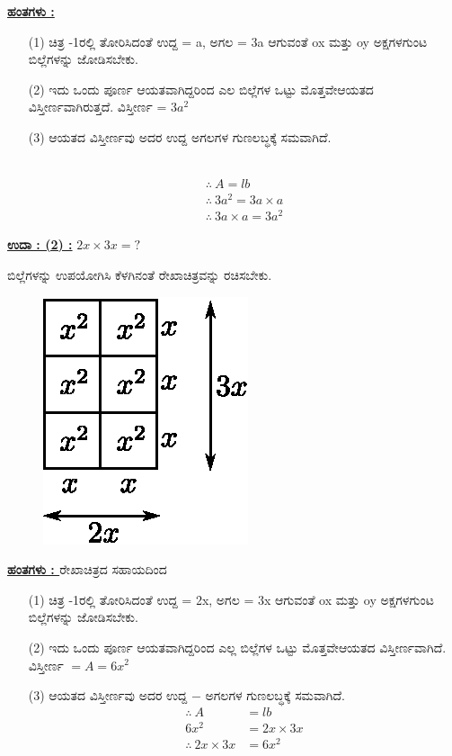 \noindent
{\textbf{\underline{ಹಂತಗಳು :}}}

\begin{itemize}
\item [(1)] ಚಿತ್ರ -1ರಲ್ಲಿ ತೋರಿಸಿದಂತೆ ಉದ್ದ = a, ಅಗಲ = 3a ಆಗುವಂತೆ ox ಮತ್ತು oy ಅಕ್ಷಗಳಗುಂಟ ಬಿಲ್ಲೆಗಳನ್ನು ಜೋಡಿಸಬೇಕು. 
\item [(2)] ಇದು ಒಂದು ಪೂರ್ಣ ಆಯತವಾಗಿದ್ದರಿಂದ ಎಲ ಬಿಲ್ಲೆಗಳ ಒಟ್ಟು ಮೊತ್ತವೇ\break ಆಯತದ ವಿಸ್ತೀರ್ಣವಾಗಿರುತ್ತದೆ. ವಿಸ್ತೀರ್ಣ = $3a^2$
\item [(3)] ಆಯತದ ವಿಸ್ತೀರ್ಣವು ಅದರ ಉದ್ದ ಅಗಲಗಳ ಗುಣಲಬ್ಧಕ್ಕೆ ಸಮವಾಗಿದೆ. 
\newpage

~
\vskip  -1.2cm
\begin{gather*}
\therefore~ A = lb \\
\therefore~ 3a^2 = 3a \times a\\
\therefore~ 3a \times a = 3a^2
\end{gather*}

\end{itemize}

\medskip
\noindent
{\textbf{\underline{ಉದಾ : (2) :}}} $2x \times 3x = ?$

ಬಿಲ್ಲೆಗಳನ್ನು ಉಪಯೋಗಿಸಿ ಕೆಳಗಿನಂತೆ ರೇಖಾಚಿತ್ರವನ್ನು ರಚಿಸಬೇಕು.
\begin{figure}[H]
\centering
\includegraphics[scale=0.9]{src/figure/chap3/fig3-29b.eps}
\end{figure}

\noindent
{\textbf{\underline{ಹಂತಗಳು : }}} ರೇಖಾಚಿತ್ರದ ಸಹಾಯದಿಂದ
\begin{itemize}
\item [(1)] ಚಿತ್ರ -1ರಲ್ಲಿ ತೋರಿಸಿದಂತೆ ಉದ್ದ = 2x, ಅಗಲ = 3x ಆಗುವಂತೆ ox ಮತ್ತು oy ಅಕ್ಷಗಳಗುಂಟ ಬಿಲ್ಲೆಗಳನ್ನು ಜೋಡಿಸಬೇಕು. 

\item [(2)] ಇದು ಒಂದು ಪೂರ್ಣ ಆಯತವಾಗಿದ್ದರಿಂದ ಎಲ್ಲ ಬಿಲ್ಲೆಗಳ ಒಟ್ಟು ಮೊತ್ತವೇ\break ಆಯತದ ವಿಸ್ತೀರ್ಣವಾಗಿದೆ. ವಿಸ್ತೀರ್ಣ $= A = 6x^2$

\item [(3)] ಆಯತದ ವಿಸ್ತೀರ್ಣವು ಅದರ ಉದ್ದ $-$ ಅಗಲಗಳ ಗುಣಲಬ್ಧಕ್ಕೆ ಸಮವಾಗಿದೆ.
\begin{align*}
\therefore~ A & = lb\\
6x^2 & = 2x \times 3x\\
\therefore~ 2x \times 3x & = 6x^2
\end{align*}

\end{itemize}


